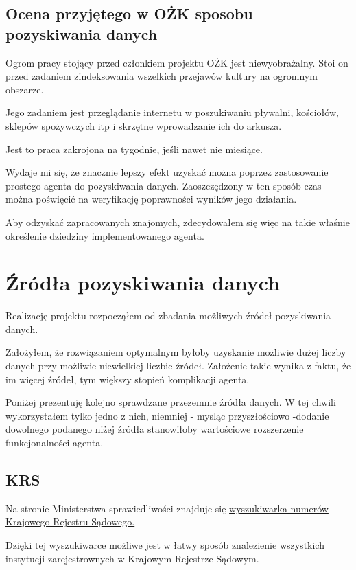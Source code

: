 \documentclass[a4 122pt]{article}
\begin{document}
		\subsection{Ocena przyjętego w OŻK sposobu pozyskiwania danych}
		
			Ogrom pracy  stojący przed członkiem projektu OŻK jest niewyobrażalny.
			Stoi on przed zadaniem zindeksowania wszelkich przejawów kultury na ogromnym obszarze.
			
			Jego zadaniem jest przeglądanie internetu w poszukiwaniu pływalni, kościołów, sklepów spożywczych itp i skrzętne wprowadzanie ich do arkusza.
			
			Jest to praca zakrojona na tygodnie, jeśli nawet nie miesiące.
			
			Wydaje mi się, że znacznie lepszy efekt uzyskać można poprzez zastosowanie prostego agenta do pozyskiwania danych.
			Zaoszczędzony w ten sposób czas można poświęcić na weryfikację poprawności wyników jego działania. 
			
			Aby odzyskać zapracowanych znajomych, zdecydowałem się więc na takie właśnie określenie dziedziny implementowanego agenta. 
	
	\section{Źródła pozyskiwania danych}
		
			Realizację projektu rozpocząłem od zbadania możliwych źródeł pozyskiwania danych.
		
			Założyłem, że rozwiązaniem optymalnym byłoby uzyskanie możliwie dużej liczby danych przy możliwie niewielkiej liczbie źródeł.
			Założenie takie wynika z faktu, że im więcej źródeł, tym większy stopień komplikacji agenta.
			
			Poniżej prezentuję kolejno sprawdzane przezemnie źródła danych. 
			W tej chwili wykorzystałem tylko jedno z nich, niemniej - mysląc przyszłościowo -dodanie dowolnego podanego niżej źródła stanowiłoby wartościowe rozszerzenie funkcjonalności agenta.
			
			\subsection{KRS}
			
				Na stronie Ministerstwa sprawiedliwości znajduje się \href{https://ems.ms.gov.pl/krs/wyszukiwaniepodmiotu?t:lb=t}{wyszukiwarka numerów Krajowego Rejestru Sądowego.}
				
				Dzięki tej wyszukiwarce możliwe jest w łatwy sposób znalezienie wszystkich instytucji zarejestrownych w Krajowym Rejestrze Sądowym.
				
\end{document}
